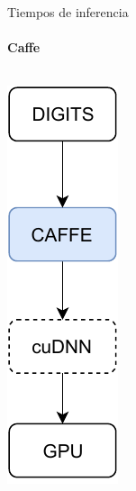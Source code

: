 \begin{frame}{Tiempos de inferencia}

\framesubtitle{Caffe}
	\begin{columns}
 \includegraphics[width=1\textwidth]{diagrama/frame2.pdf}
        

\end{columns}
\end{frame}

